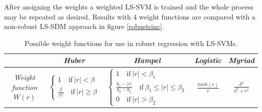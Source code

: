 \par After assigning the weights a weighted LS-SVM is trained and the whole process may be repeated as desired. Results with 4 weight functions are compared with a non-robust LS-SDM approach in figure \ref{robustsinc}.
\vspace{0.4cm}
\begin{table}[h]
\centering
\begin{tabular}{c|cccc}
& \textit{Huber} & \textit{Hampel} & \textit{Logistic} & \textit{Myriad}\\
\hline
\textit{Weight function} $W(r)$ & $\begin{cases}1\quad\text{if}\ |r|<\beta\\\frac{\beta}{|r|}\quad\text{if}\ |r|\geq\beta\end{cases}$ & $\begin{cases}1\quad\text{if}\ |r|<\beta_1\\\frac{b_2-|r|}{b_2-b_1}\quad\text{if}\ \beta_1\leq|r|\leq\beta_2\\0\quad\text{if}\ |r|>\beta_2\end{cases}$ & $\frac{tanh(r)}{r}$ & $\frac{\delta^2}{\delta^2+r^2}$\\
\end{tabular}
\caption{Possible weight functions for use in robust regression with LS-SVMs.}
\label{roburegwf}
\end{table}

